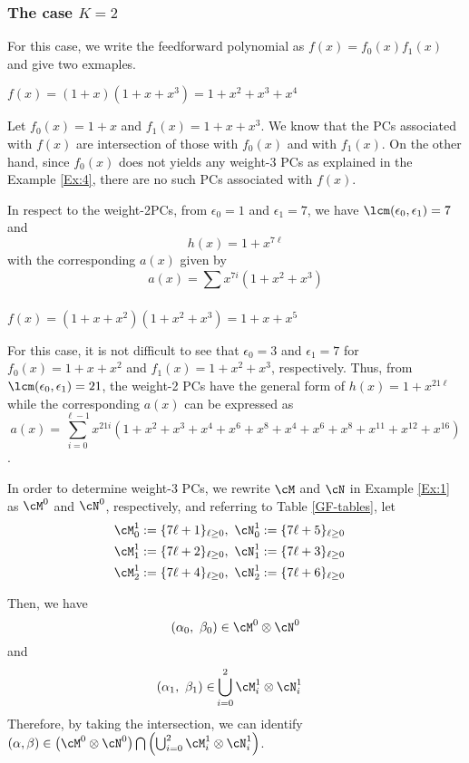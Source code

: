 \subsubsection{The case $K=2$}

For this case, we write the feedforward polynomial as $f(x) =f_0(x)f_1(x)$ and give two exmaples.
\begin{example}
	$f(x)= (1+x)(1+x+x^3)=1+x^2+x^3+x^4$\newline
	
	Let $f_0(x)=1+x$ and $f_1(x)=1+x+x^3$. We know that the PCs  associated with $f(x)$ are intersection of those with $f_0(x)$ and with $f_1(x)$. 
	On the other hand, since $f_0(x)$ does not yields any weight-3 PCs as explained in the Example \ref{Ex:4}, there are no such PCs associated with $f(x)$.
	
	In respect to the weight-2PCs, from $\epsilon_0=1$ and $\epsilon_1=7$, we have $\lcm(\epsilon_0,\epsilon_1)=7$ and
	$$h(x) =1+x^{7\ell}$$
	with the corresponding $a(x)$ given by
	$$a(x) = \sum_{}^{}x^{7i}(1+x^2+x^3)$$
	\label{Ex:5}	
\end{example}

\begin{example}
$f(x)=(1+x+x^2)(1+x^2+x^3)=1+x+x^5$

For this case, it is not difficult to see that $\epsilon_0=3$ and $\epsilon_1=7$ for $f_0(x)=1+x+x^2$ and $f_1(x)=1+x^2+x^3$, respectively. Thus, from $\lcm(\epsilon_0,\epsilon_1)=21$, the weight-2 PCs have the general form of $h(x)=1+x^{21\ell}$ while the corresponding $a(x)$ can be expressed as $$a(x)=\sum_{i=0}^{\ell-1} x^{21i}(1+x^2+x^3+x^4+x^6+x^8+x^{4}+x^{6}+x^{8}+x^{11}+x^{12}+x^{16})$$.


In order to determine weight-3 PCs, we rewrite $\cM$ and $\cN$ in Example \ref{Ex:1} as $\cM^0$ and $\cN^0$, respectively,
and referring to Table \ref{GF-tables}, let
\begin{align}
	\cM_0^1 &:= \{7\ell + 1\}_{\ell \geq 0},~\cN_0^1 := \{7\ell + 5\}_{\ell \geq 0}\cr
	\cM_1^1 &:= \{7\ell + 2\}_{\ell \geq 0},~\cN_1^1 := \{7\ell + 3\}_{\ell \geq 0}\cr
	\cM_2^1 &:= \{7\ell + 4\}_{\ell \geq 0},~\cN_2^1 := \{7\ell + 6\}_{\ell \geq 0}
\end{align}

Then, we have
\[
(\alpha_0,~\beta_0) \in \cM^0\otimes\cN^0 
\]
and
\begin{equation*}
\begin{split}
(\alpha_1,~\beta_1) \in &\bigcup_{i=0}^2 \cM_i^1\otimes\cN_i^1 
\end{split}
\end{equation*}
Therefore, by taking the intersection, we can identify $(\alpha,\beta) \in \left(\cM^0\otimes\cN^0\right)\bigcap\left(\bigcup_{i=0}^2 \cM_i^1\otimes\cN_i^1 \right) $.
\label{Ex:6}
\end{example}

